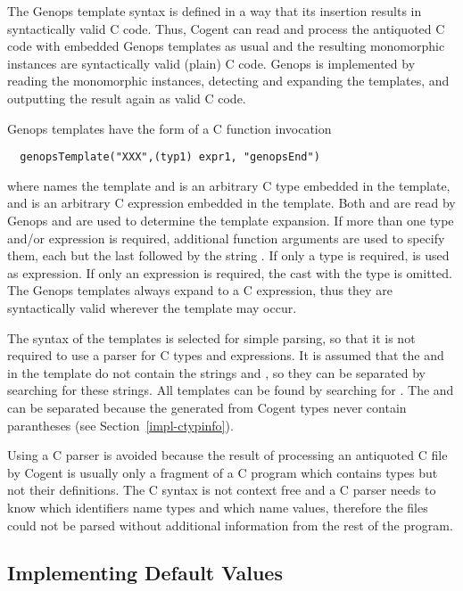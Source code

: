 The Genops template syntax is defined in a way that its insertion results in syntactically valid C code. Thus, 
Cogent can read and process the antiquoted C code with embedded Genops templates as usual and the resulting 
monomorphic instances are syntactically valid (plain) C code. Genops is implemented by reading the monomorphic 
instances, detecting and expanding the templates, and outputting the result again as valid C code.

Genops templates have the form of a C function invocation
\begin{verbatim}
  genopsTemplate("XXX",(typ1) expr1, "genopsEnd")
\end{verbatim}
where  names the template and  is an arbitrary C type embedded in the template, and 
is an arbitrary C expression embedded in the template. Both  and  are read by Genops and are 
used to determine the template expansion. If more than one type and/or expression is required, additional function
arguments are used to specify them, each but the last followed by the string . If only a type is 
required,  is used as expression. If only an expression is required, the cast with the type is omitted. The Genops 
templates always expand to a C expression, thus they are syntactically valid wherever the template may occur.

The syntax of the templates is selected for simple parsing, so that it is not required to use a parser for C types and 
expressions. It is assumed that the  and  in the template do not contain the strings 
and , so they can be separated by searching for these strings. All templates can be found by searching for 
. The  and  can be separated because the  generated from Cogent 
types never contain parantheses (see Section~\ref{impl-ctypinfo}).

Using a C parser is avoided because the result of processing an antiquoted C file by Cogent is usually only a fragment of
a C program which contains types but not their definitions. The C syntax is not context free and a C parser needs to 
know which identifiers name types and which name values, therefore the files could not be parsed without additional information
from the rest of the program.

\subsection{Implementing Default Values}
\label{impl-operations-default}

